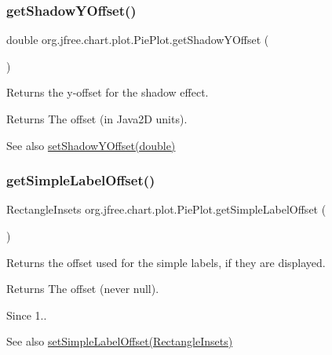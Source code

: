 \subsubsection{\texorpdfstring{get\+Shadow\+Y\+Offset()}{getShadowYOffset()}}
{\footnotesize\ttfamily double org.\+jfree.\+chart.\+plot.\+Pie\+Plot.\+get\+Shadow\+Y\+Offset (\begin{DoxyParamCaption}{ }\end{DoxyParamCaption})}

Returns the y-\/offset for the shadow effect.

\begin{DoxyReturn}{Returns}
The offset (in Java2D units).
\end{DoxyReturn}
\begin{DoxySeeAlso}{See also}
\mbox{\hyperlink{classorg_1_1jfree_1_1chart_1_1plot_1_1_pie_plot_a9822ca063910bf91ac9f7c73e70428ee}{set\+Shadow\+Y\+Offset(double)}} 
\end{DoxySeeAlso}
\mbox{\label{classorg_1_1jfree_1_1chart_1_1plot_1_1_pie_plot_a224bcc976ff82ad7446319febe4e5b65}} 
\subsubsection{\texorpdfstring{get\+Simple\+Label\+Offset()}{getSimpleLabelOffset()}}
{\footnotesize\ttfamily Rectangle\+Insets org.\+jfree.\+chart.\+plot.\+Pie\+Plot.\+get\+Simple\+Label\+Offset (\begin{DoxyParamCaption}{ }\end{DoxyParamCaption})}

Returns the offset used for the simple labels, if they are displayed.

\begin{DoxyReturn}{Returns}
The offset (never {\ttfamily null}).
\end{DoxyReturn}
\begin{DoxySince}{Since}
1..
\end{DoxySince}
\begin{DoxySeeAlso}{See also}
\mbox{\hyperlink{classorg_1_1jfree_1_1chart_1_1plot_1_1_pie_plot_af6b12983770243188338750c9858183d}{set\+Simple\+Label\+Offset(\+Rectangle\+Insets)}} 
\end{DoxySeeAlso}
\mbox{\label{classorg_1_1jfree_1_1chart_1_1plot_1_1_pie_plot_a7def1f2f684232f0a372168809a88bbe}} 
